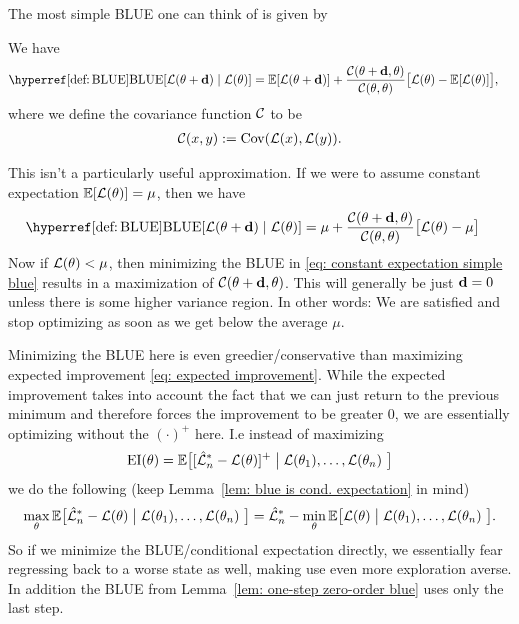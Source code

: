 The most simple BLUE one can think of is given by

\begin{lemma}\label{lem: one-step zero-order blue}
	We have
	\begin{align*}
		\BLUE[\Loss(\param + \step) \mid \Loss(\param)]
		&= \E[\Loss(\param + \step)]
		+ \frac{\C(\param+\step,\param)}{\C(\param, \param)}
		\big[\Loss(\param) - \E[\Loss(\param)]\big],
	\end{align*}
	where we define the covariance function \(\mathcal{C}\) to be
	\begin{align*}
		\mathcal{C}(x,y):= \operatorname{Cov}(\mathcal{L}(x), \mathcal{L}(y)).
	\end{align*}
\end{lemma}

This isn't a particularly useful approximation. If we were to assume constant
expectation \(\mathbb{E}[\mathcal{L}(\theta)] = \mu\), then we have
\begin{align}\label{eq: constant expectation simple blue}
	\BLUE[\Loss(\param + \step) \mid \Loss(\param)]
	&=\mu 
	+ \frac{\C(\param+\step,\param)}{\C(\param, \param)}
	\big[\Loss(\param) - \mu\big]
\end{align}
Now if \(\mathcal{L}(\theta) < \mu\), then minimizing the BLUE in
\eqref{eq: constant expectation simple blue} results in a maximization of
\(\mathcal{C}(\theta+\mathbf{d}, \theta)\). This will generally be just \(\mathbf{d}=0\) unless
there is some higher variance region. In other words: We are satisfied and
stop optimizing as soon as we get below the average \(\mu\).

Minimizing the BLUE here is even greedier/conservative than maximizing
expected improvement \eqref{eq: expected improvement}. While the expected
improvement takes into account the fact that we can just return to the previous
minimum and therefore forces the improvement to be greater \(0\), we are
essentially optimizing without the \((\cdot)^+\) here. I.e instead of
maximizing
\begin{align*}
	\operatorname{EI}(\theta) = \mathbb{E}\big[
			[\hat{\mathcal{L}}_n^*- \mathcal{L}(\theta)]^+
			\bigm|
			\mathcal{L}(\theta_1),\dots, \mathcal{L}(\theta_n)\
		\big]
\end{align*}
we do the following (keep Lemma~\ref{lem: blue is cond. expectation} in mind)
\begin{align*}
	\max_{\theta} \mathbb{E}\big[
		\hat{\mathcal{L}}_n^*- \mathcal{L}(\theta)
		\bigm|
		\mathcal{L}(\theta_1),\dots, \mathcal{L}(\theta_n)\
	\big]
	= \hat{\mathcal{L}}_n^* - \min_{\theta} \mathbb{E}\big[
		\mathcal{L}(\theta)
		\bigm|
		\mathcal{L}(\theta_1),\dots, \mathcal{L}(\theta_n)\
	\big].
\end{align*}
So if we minimize the BLUE/conditional expectation directly, we essentially fear
regressing back to a worse state as well, making use even more exploration
averse. In addition the BLUE from Lemma~\ref{lem: one-step zero-order blue}
uses only the last step.

